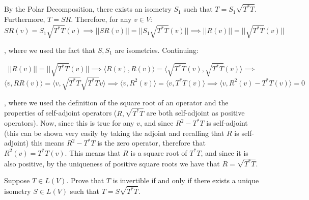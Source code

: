 \begin{solution}

    By the Polar Decomposition, there exists an isometry $S_1$ such that $T = S_1\sqrt{T^*T}$. Furthermore, $T = SR$. Therefore, for any $v \in V$:
    $$SR(v) = S_1\sqrt{T^*T}(v) \implies \lvert \lvert SR(v) \rvert \rvert = \lvert \lvert S_1\sqrt{T^*T}(v) \rvert \rvert \implies \lvert \lvert R(v) \rvert \rvert = \lvert \lvert \sqrt{T^*T}(v) \rvert \rvert$$

    , where we used the fact that $S, S_1$ are isometries. Continuing:

    $$\lvert \lvert R(v) \rvert \rvert = \lvert \lvert \sqrt{T^*T}(v) \rvert \rvert \implies \langle R(v), R(v) \rangle = \langle \sqrt{T^*T}(v), \sqrt{T^*T}(v) \rangle \implies $$
    $$\langle v, RR(v) \rangle = \langle v, \sqrt{T^*T} \sqrt{T^*T}v \rangle \implies \langle v, R^2(v) \rangle = \langle v, T^*T(v) \rangle \implies \langle v, R^2(v) - T^*T(v) \rangle = 0$$

    , where we used the definition of the square root of an operator and the properties of self-adjoint operators ($R, \sqrt{T^*T}$ are both self-adjoint as positive operators). Now, since this is true for any $v$, and since $R^2 - T^*T$ is self-adjoint (this can be shown very easily by taking the adjoint and recalling that $R$ is self-adjoint) this means $R^2 - T^*T$ is the zero operator, therefore that $R^2(v) = T^*T(v)$. This means that $R$ is a square root of $T^*T$, and since it is also positive, by the uniqueness of positive square roots we have that $R = \sqrt{T^*T}$.
\end{solution}

\newpage
\begin{exercise}{9}
    Suppose $T \in L(V)$. Prove that $T$ is invertible if and only if there exists a unique isometry $S \in L(V)$ such that $T = S\sqrt{T^*T}$.
\end{exercise}

